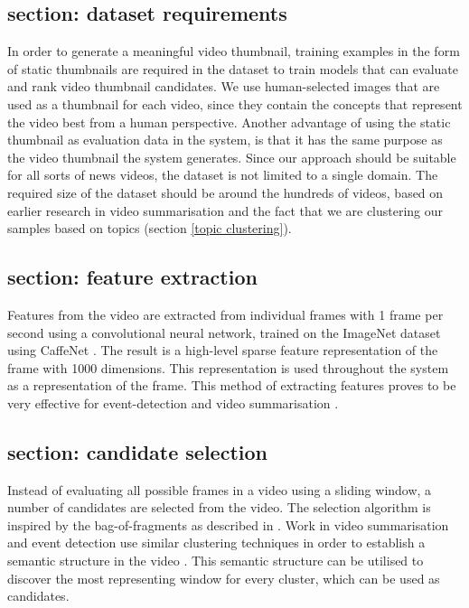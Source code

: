 \documentclass{../resources/sig-alternate-05-2015}
\begin{document}
\subsection{section: dataset requirements}
\label{section: dataset requirements}
In order to generate a meaningful video thumbnail, training examples in the form of static thumbnails are required in the dataset to train models that can evaluate and rank video thumbnail candidates. We use human-selected images that are used as a thumbnail for each video, since they contain the concepts that represent the video best from a human perspective. Another advantage of using the static thumbnail as evaluation data in the system, is that it has the same purpose as the video thumbnail the system generates. Since our approach should be suitable for all sorts of news videos, the dataset is not limited to a single domain. The required size of the dataset should be around the hundreds of videos, based on earlier research in video summarisation \cite{Almeida:2012be,Christel:2004in,Money:2008fn} and the fact that we are clustering our samples based on topics (section \ref{topic clustering}).

\subsection{section: feature extraction}
\label{section: feature extraction}
Features from the video are extracted from individual frames with 1 frame per second using a convolutional neural network, trained on the ImageNet dataset \cite{Krizhevsky:2012wl} using CaffeNet \cite{Jia:2014cm}. The result is a high-level sparse feature representation of the frame with 1000 dimensions. This representation is used throughout the system as a representation of the frame. This method of extracting features proves to be very effective for event-detection \cite{Habibian:2013ks,Althoff:2012gf,Jiang:2012fy} and video summarisation \cite{Ajmal:2012hi,Mazloom:2015el}.

\subsection{section: candidate selection}
\label{section: candidate selection}

Instead of evaluating all possible frames in a video using a sliding window, a number of candidates are selected from the video. The selection algorithm is inspired by the bag-of-fragments as described in \cite{Mettes:2015vg}. Work in video summarisation and event detection use similar clustering techniques in order to establish a semantic structure in the video \cite{Yuan:2011fu,Habibian:2014dc}. This semantic structure can be utilised to discover the most representing window for every cluster, which can be used as candidates.
\end{document}
